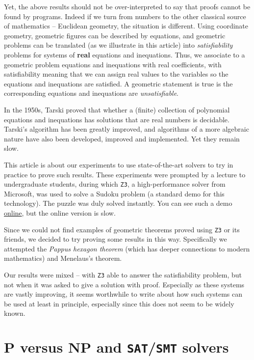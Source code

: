 \documentclass{amsart}
\theoremstyle{plain}
\theoremstyle{definition}
\theoremstyle{remark}
\begin{document}
Yet, the above results should not be over-interpreted to say that proofs
cannot be found by programs. Indeed if we turn from numbers to the other
classical source of mathematics -- Euclidean geometry, the situation is
different. Using coordinate geometry, geometric figures can be described by equations,
and geometric problems can be translated (as we illustrate in this article) into
\emph{satisfiability} problems for systems of \textbf{real} equations and inequations. Thus, we 
associate to a geometric problem equations and inequations with real coefficients, 
with satisfiability meaning that we can
assign real values to the variables so the equations and inequations are satisfied. 
A geometric statement is true is the corresponding equations and inequations are \emph{unsatisfiable}.

In the 1950s, Tarski proved that whether a (finite)
collection of polynomial equations and inequations has solutions that
are real numbers is decidable.  Tarski's algorithm has been greatly improved,
and algorithms of a more algebraic nature have also been developed,
improved and implemented. Yet they remain slow.

This article is about our experiments to use
state-of-the-art solvers to try in practice to prove such results.
These experiments were prompted by a lecture
to undergraduate students, during which \texttt{Z3}, a high-performance
solver from Microsoft, was used to solve a Sudoku problem (a standard demo for
this technology). The puzzle was duly solved instantly. You can see such
a demo \href{https://rise4fun.com/Z3/Cs7p}{online}, but the online
version is slow.

Since we could not find examples of geometric theorems proved using \texttt{Z3} or
its friends, we decided to try proving
some results in this way. Specifically we attempted the \emph{Pappus hexagon theorem}
(which has deeper connections to modern mathematics) and Menelaus's theorem.

Our results were mixed -- with \texttt{Z3} able to answer the satisfiability problem,
but not when it was asked to give a solution with proof.
Especially as these systems are vastly improving, it seems worthwhile to
write about how such systems can be used at least in principle,
especially since this does not seem to be widely known.

\hypertarget{p-versus-np-and-satsmt-solvers}{%
	\section{P versus NP and \texttt{SAT}/\texttt{SMT}
	  solvers}\label{p-versus-np-and-satsmt-solvers}}
\end{document}
